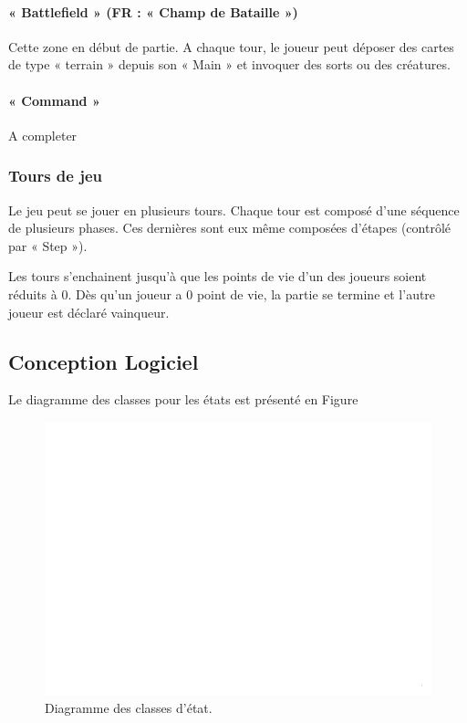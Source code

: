 \documentclass[a4paper,12pt]{article}
\begin{document}
\paragraph{« Battlefield » (FR : « Champ de Bataille »)}
Cette zone en début de partie. A chaque tour, le joueur peut déposer des cartes de type « terrain » depuis son « Main » et invoquer des sorts ou des créatures. 

\paragraph{« Command »}
A completer

\subsubsection{Tours de jeu}
Le jeu peut se jouer en plusieurs tours. Chaque tour est composé d’une séquence de plusieurs phases. Ces dernières sont eux même composées d’étapes (contrôlé par « Step »).

Les tours s’enchainent jusqu’à que les points de vie d'un des joueurs soient réduits à 0. Dès qu'un joueur a 0 point de vie, la partie se termine et l'autre joueur est déclaré vainqueur.

\subsection{Conception Logiciel}
Le diagramme des classes pour les états est présenté en Figure

\begin{landscape}
\begin{figure}[p]
\includegraphics[width=0.95\paperheight, page=4]{state.pdf}
\caption{\label{uml:state}Diagramme des classes d'état.} 
\end{figure}
\end{landscape}
\end{document}
